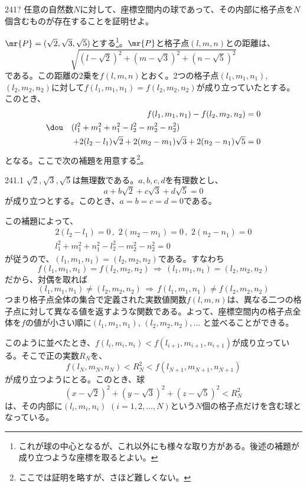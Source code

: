 \begin{prob}{241}{\hosi ?}{}
 任意の自然数$N$に対して、座標空間内の球であって、その内部に格子点を$N$個含むものが存在することを証明せよ。
\end{prob}
$\mr{P}=(\sqrt{2}, \sqrt{3}, \sqrt{5})$とする\footnote{これが球の中心となるが、これ以外にも様々な取り方がある。後述の補題が成り立つような座標を取るとよい。}。$\mr{P}$と格子点$(l,m,n)$との距離は、
\[ \sqrt{(l-\sqrt{2})^2+(m-\sqrt{3})^2+(n-\sqrt{5})^2} \]
である。この距離の2乗を$f(l,m,n)$とおく。2つの格子点$(l_1,m_1,n_1)$, $(l_2,m_2,n_2)$に対して$f(l_1,m_1,n_1)=f(l_2,m_2,n_2)$が成り立っていたとする。このとき、
\begin{align*}
 f(l_1,m_1,n_1)-f(l_2,m_2,n_2)&=0 \\
 \dou\quad (l_1^2+m_1^2+n_1^2-l_2^2-m_2^2-n_2^2) \qquad\qquad\qquad\qquad & \\
  + 2(l_2-l_1)\sqrt{2}+2(m_2-m_1)\sqrt{3}+2(n_2-n_1)\sqrt{5}&=0
\end{align*}
となる。ここで次の補題を用意する\footnote{ここでは証明を略すが、さほど難しくない。}。
\begin{subthm}{241.1}
 $\sqrt{2}, \sqrt{3}, \sqrt{5}$は無理数である。$a, b, c, d$を有理数とし、
 \[ a+b\sqrt{2}+c\sqrt{3}+d\sqrt{5}=0 \]
 が成り立つとする。このとき、$a=b=c=d=0$である。
\end{subthm}
この補題によって、
\begin{align*}
 2(l_2-l_1)=0 \,,\,\, 2(m_2-m_1)=0 \,,\,\, 2(n_2-n_1)=0 \\
 l_1^2+m_1^2+n_1^2-l_2^2-m_2^2-n_2^2=0
\end{align*}
が従うので、$(l_1, m_1, n_1)=(l_2, m_2, n_2)$である。すなわち
\[ f(l_1, m_1, n_1)=f(l_2, m_2, n_2) \,\Rightarrow\, (l_1, m_1, n_1)=(l_2, m_2, n_2) \]
だから、対偶を取れば
\[ (l_1, m_1, n_1)\neq (l_2, m_2, n_2) \,\Rightarrow\, f(l_1, m_1, n_1)\neq f(l_2, m_2, n_2) \]
つまり格子点全体の集合で定義された実数値関数$f(l,m,n)$は、異なる二つの格子点に対して異なる値を返すような関数である。よって、座標空間内の格子点全体を$f$の値が小さい順に$(l_1, m_1, n_1)$, $(l_2, m_2, n_2), \ldots$ と並べることができる。

このように並べたとき、$f(l_i, m_i, n_i) < f(l_{i+1}, m_{i+1}, n_{i+1})$が成り立っている。そこで正の実数$R_N$を、
\[ f(l_N, m_N, n_N) < R_N^2 < f(l_{N+1}, m_{N+1}, n_{N+1}) \]
が成り立つようにとる。このとき、球
\[ (x-\sqrt{2})^2+(y-\sqrt{3})^2+(z-\sqrt{5})^2 < R_N^2 \]
は、その内部に$(l_i, m_i, n_i)$ $(i=1,2,\dots,N)$という$N$個の格子点だけを含む球となっている。